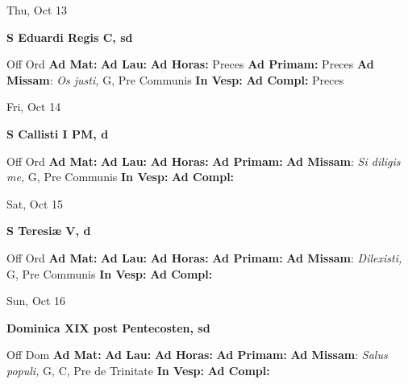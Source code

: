 \documentclass[10pt]{article}
\begin{document}
\begin{minipage}{3.5in}
\vspace{2em}\begin{center}
Thu, Oct 13
\end{center}\textbf{ \large S Eduardi Regis C, \textnormal{\normalsize sd}}
\begin{justify}
Off Ord
\textbf{Ad Mat: }
\textbf{Ad Lau: }
\textbf{Ad Horas: }Preces
\textbf{Ad Primam: }Preces
\textbf{Ad Missam}: \textit{Os justi,} G, Pre Communis
\textbf{In Vesp: }
\textbf{Ad Compl: }Preces\end{justify}
\end{minipage}



\begin{minipage}{3.5in}
\vspace{2em}\begin{center}
Fri, Oct 14
\end{center}\textbf{ \large S Callisti I PM, \textnormal{\normalsize d}}
\begin{justify}
Off Ord
\textbf{Ad Mat: }
\textbf{Ad Lau: }
\textbf{Ad Horas: }
\textbf{Ad Primam: }
\textbf{Ad Missam}: \textit{Si diligis me,} G, Pre Communis
\textbf{In Vesp: }
\textbf{Ad Compl: }\end{justify}
\end{minipage}



\begin{minipage}{3.5in}
\vspace{2em}\begin{center}
Sat, Oct 15
\end{center}\textbf{ \large S Teresiæ V, \textnormal{\normalsize d}}
\begin{justify}
Off Ord
\textbf{Ad Mat: }
\textbf{Ad Lau: }
\textbf{Ad Horas: }
\textbf{Ad Primam: }
\textbf{Ad Missam}: \textit{Dilexisti,} G, Pre Communis
\textbf{In Vesp: }
\textbf{Ad Compl: }\end{justify}
\end{minipage}



\begin{minipage}{3.5in}
\vspace{2em}\begin{center}
Sun, Oct 16
\end{center}\textbf{ \large Dominica XIX post Pentecosten, \textnormal{\normalsize sd}}
\begin{justify}
Off Dom
\textbf{Ad Mat: }
\textbf{Ad Lau: }
\textbf{Ad Horas: }
\textbf{Ad Primam: }
\textbf{Ad Missam}: \textit{Salus populi,} G, C, Pre de Trinitate
\textbf{In Vesp: }
\textbf{Ad Compl: }\end{justify}
\end{minipage}
\end{document}
